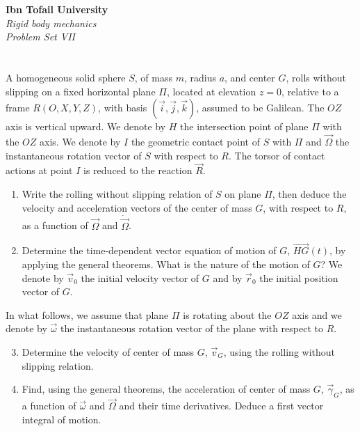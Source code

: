 \documentclass[12pt]{article}
\begin{document}
\begin{center}
\Large\textbf{Ibn Tofail University} \\[1em]
\large\textit{Rigid body mechanics} \\[2em]
\large\textit{Problem Set VII} \\[0.5em]
\end{center}

\vspace{1cm}

\section{}

A homogeneous solid sphere $S$, of mass $m$, radius $a$, and center $G$, rolls without slipping on a fixed horizontal plane $\Pi$, located at elevation $z = 0$, relative to a frame $R(O, X, Y, Z)$, with basis $(\vec{i}, \vec{j}, \vec{k})$, assumed to be Galilean. The $OZ$ axis is vertical upward. We denote by $H$ the intersection point of plane $\Pi$ with the $OZ$ axis. We denote by $I$ the geometric contact point of $S$ with $\Pi$ and $\vec{\Omega}$ the instantaneous rotation vector of $S$ with respect to $R$. The torsor of contact actions at point $I$ is reduced to the reaction $\vec{R}$.

\begin{enumerate}
    \item Write the rolling without slipping relation of $S$ on plane $\Pi$, then deduce the velocity and acceleration vectors of the center of mass $G$, with respect to $R$, as a function of $\vec{\Omega}$ and $\dot{\vec{\Omega}}$.
    \item Determine the time-dependent vector equation of motion of $G$, $\overrightarrow{HG}(t)$, by applying the general theorems. What is the nature of the motion of $G$? We denote by $\vec{v}_0$ the initial velocity vector of $G$ and by $\vec{r}_0$ the initial position vector of $G$.
\end{enumerate}

In what follows, we assume that plane $\Pi$ is rotating about the $OZ$ axis and we denote by $\vec{\omega}$ the instantaneous rotation vector of the plane with respect to $R$.

\begin{enumerate}
    \setcounter{enumi}{2}
    \item Determine the velocity of center of mass $G$, $\vec{v}_G$, using the rolling without slipping relation.
    \item Find, using the general theorems, the acceleration of center of mass $G$, $\vec{\gamma}_G$, as a function of $\vec{\omega}$ and $\vec{\Omega}$ and their time derivatives. Deduce a first vector integral of motion.
\end{enumerate}
\end{document}
